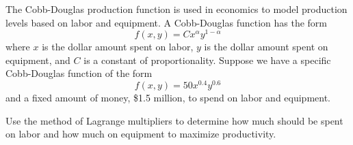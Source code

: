 \begin{activity} \label{A:10.8.5} The Cobb-Douglas production
  function is used in
  economics to model production levels based on labor and equipment. A
  Cobb-Douglas function has the form 
  \[f(x,y) = Cx^{\alpha}y^{1-\alpha}\] where $x$ is the dollar amount
  spent on labor, $y$ is the dollar amount spent on
  equipment, and $C$ is a constant of proportionality. Suppose we have
  a specific Cobb-Douglas function of the 
  form
  \[f(x, y) = 50 x^{0.4}y^{0.6}\] 
  and a fixed amount of money, \$1.5 million, to spend on labor and
  equipment.  

  Use the method of Lagrange multipliers to determine how much should
  be spent on labor and how much on equipment to maximize productivity.

\end{activity} 
\afterpa 
